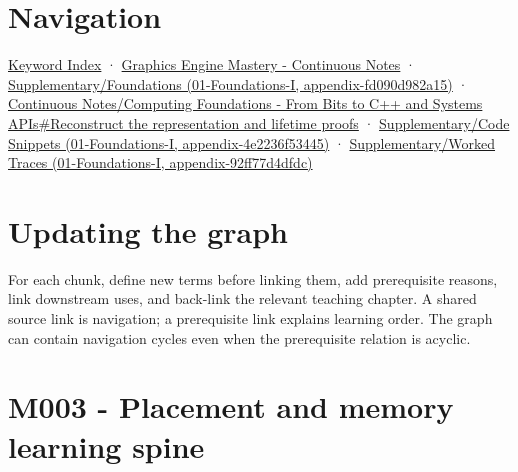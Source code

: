 \section{Navigation}\label{appendix-4ad47bdd269a-navigation}

\hyperref[appendix-a6d556a4ef50]{Keyword Index} · \href{Graphics\%20Engine\%20Mastery\%20-\%20Continuous\%20Notes}{Graphics Engine Mastery - Continuous Notes} · \href{../01-Foundations-I/main.pdf\#nameddest=appendix-fd090d982a15}{Supplementary/Foundations (01-Foundations-I, appendix-fd090d982a15)} · \href{Continuous\%20Notes/Computing\%20Foundations\%20-\%20From\%20Bits\%20to\%20C++\%20and\%20Systems\%20APIs\#Reconstruct\%20the\%20representation\%20and\%20lifetime\%20proofs}{Continuous Notes/Computing Foundations - From Bits to C++ and Systems APIs\#Reconstruct the representation and lifetime proofs} · \href{../01-Foundations-I/main.pdf\#nameddest=appendix-4e2236f53445}{Supplementary/Code Snippets (01-Foundations-I, appendix-4e2236f53445)} · \href{../01-Foundations-I/main.pdf\#nameddest=appendix-92ff77d4dfdc}{Supplementary/Worked Traces (01-Foundations-I, appendix-92ff77d4dfdc)}

\section{Updating the graph}\label{appendix-4ad47bdd269a-updating-the-graph}

For each chunk, define new terms before linking them, add prerequisite reasons, link downstream uses, and back-link the relevant teaching chapter. A shared source link is navigation; a prerequisite link explains learning order. The graph can contain navigation cycles even when the prerequisite relation is acyclic.

\section{M003 - Placement and memory learning spine}\label{appendix-4ad47bdd269a-m003---placement-and-memory-learning-spine}

